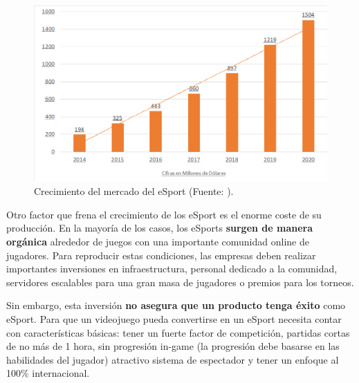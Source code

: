 \begin{figure}[!t]
    \centering
    \includegraphics[width=1\textwidth]{images/estadodelarte/mercado/crecimiento-esport}
    \caption{Crecimiento del mercado del eSport (Fuente: \cite{libro_blanco}).}
    \label{crecimiento-esport}
\end{figure}

Otro factor que frena el crecimiento de los eSport es el enorme coste de su producción. En la mayoría de los casos, los eSports \textbf{surgen de manera orgánica} alrededor de juegos con una importante comunidad online de jugadores. Para reproducir estas condiciones, las empresas deben realizar importantes inversiones en infraestructura, personal dedicado a la comunidad, servidores escalables para una gran masa de jugadores o premios para los torneos. 

Sin embargo, esta inversión \textbf{no asegura que un producto tenga éxito} como eSport. Para que un videojuego pueda convertirse en un eSport necesita contar con características básicas: tener un fuerte factor de competición, partidas cortas de no más de 1 hora, sin progresión in-game (la progresión debe basarse en las habilidades del jugador) atractivo sistema de espectador y tener un enfoque al 100\% internacional.

